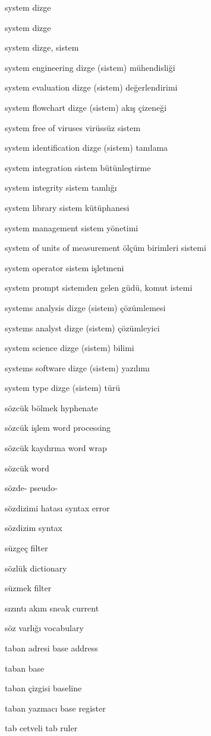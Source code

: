 \documentclass[12pt,fleqn]{article}\usepackage{../../common}
\begin{document}
system dizge

system dizge

system dizge, sistem

system engineering dizge (sistem) mühendisliği

system evaluation dizge (sistem) değerlendirimi

system flowchart dizge (sistem) akış çizeneği

system free of viruses virüssüz sistem

system identification dizge (sistem) tanılama

system integration sistem bütünleştirme

system integrity sistem tamlığı

system library sistem kütüphanesi

system management sistem yönetimi

system of units of measurement ölçüm birimleri sistemi

system operator sistem işletmeni

system prompt sistemden gelen güdü, komut istemi

systems analysis dizge (sistem) çözümlemesi

systems analyst dizge (sistem) çözümleyici

system science dizge (sistem) bilimi

systems software dizge (sistem) yazılımı

system type dizge (sistem) türü

sözcük bölmek hyphenate

sözcük işlem word processing

sözcük kaydırma word wrap

sözcük word

sözde- pseudo-

sözdizimi hatası syntax error

sözdizim syntax

süzgeç filter

sözlük dictionary

süzmek filter

sızıntı akım sneak current

söz varlığı vocabulary

taban adresi base address

taban base

taban çizgisi baseline

taban yazmacı base register

tab cetveli tab ruler
\end{document}
